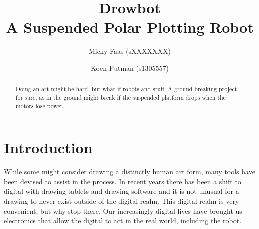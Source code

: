 \documentclass[12pt]{article}
\title{\vspace{-7em}
\huge Drowbot \\ \vspace{.5em}
\Large A Suspended Polar Plotting Robot}
\author{Micky Faas (sXXXXXXX) \and Koen Putman (s1305557)}
\date{}
\begin{document}
\maketitle
\begin{abstract}


Doing an art might be hard, but what if robots and stuff.
A ground-breaking project for sure, as in the ground might break if the
suspended platform drops when the motors lose power.

\end{abstract}

\section{Introduction}
\label{sec:intro}

While some might consider drawing a distinctly human art form,
many tools have been devised to assist in the process.
In recent years there has been a shift to digital with drawing
tablets and drawing software and it is not unusual for a drawing
to never exist outside of the digital realm.
This digital realm is very convenient, but why stop there.
Our increasingly digital lives have brought us electronics that
allow the digital to act in the real world, including the robot.
\end{document}
